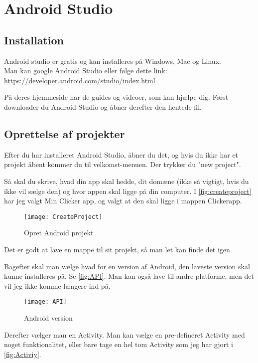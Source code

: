 \chapter{Android Studio}

\section{Installation}
Android studio er gratis og kan installeres på Windows, Mac og Linux.\\
Man kan google Android Studio eller følge dette link:\\
\url{https://developer.android.com/studio/index.html}

På deres hjemmeside har de guides og videoer, som kan hjælpe dig.
Først downloader du Android Studio og åbner derefter den hentede fil.

\section{Oprettelse af projekter}
Efter du har installeret Android Studio, åbner du det, og hvis du ikke har et projekt åbent kommer du til velkomst-menuen. Der trykker du "new project".

Så skal du skrive, hvad din app skal hedde, dit domæne (ikke så vigtigt, hvis du ikke vil sælge den) og hvor appen skal ligge på din computer. I \autoref{fig:createproject} har jeg valgt Min Clicker app, og valgt at den skal ligge i mappen Clickerapp. 
\begin{figure}[h]
	\texttt{[image: CreateProject]}
	\caption{Opret Android projekt}
	\label{fig:createproject}
\end{figure}
Det er godt at lave en mappe til sit projekt, så man let kan finde det igen. 

Bagefter skal man vælge hvad for en version af Android, den laveste version skal kunne installeres på. Se \autoref{fig:API}. Man kan også lave til andre platforme, men det vil jeg ikke komme længere ind på. 
\begin{figure}[h]
	\texttt{[image: API]}
	\caption{Android version}
	\label{fig:API}
\end{figure}

Derefter vælger man en Activity.
Man kan vælge en pre-defineret Activity med noget funktionalitet, eller bare tage en hel tom Activity som jeg har gjort i \autoref{fig:Activiy}.


